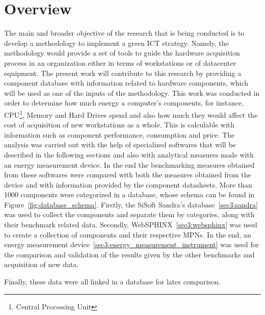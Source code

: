 \section{Overview} \label{sec3:overview}
    The main and broader objective of the research that is being conducted is to develop a methodology to implement a green ICT strategy. Namely, the methodology would provide a set of tools to guide the hardware acquisition process in an organization either in terms of workstations or of datacenter equipment.
    The present work will contribute to this research by providing a component database with information related to hardware components, which will be used as one of the inputs of the methodology.
    This work was conducted in order to determine how much energy a computer's components, for instance, CPU\footnote{Central Processing Unit}, Memory and Hard Drives spend and also how much they would affect the cost of acquisition of new workstations as a whole. This is calculable with information such as component performance, consumption and price. The analysis was carried out with the help of specialized softwares that will be described in the following sections and also with analytical measures made with an energy measurement device. In the end the benchmarking measures obtained from these softwares were compared with both the measures obtained from the device and with information provided by the component datasheets. More than 1000 components were categorized in a database, whose schema can be found in Figure~\ref{fig:database_schema}. Firstly, the SiSoft Sandra's database~\ref{sec3:sandra} was used to collect the components and separate them by categories, along with their benchmark related data. Secondly, WebSPHINX~\ref{sec3:websphinx} was used to create a collection of components and their respective MPNs. In the end, an energy measurement device~\ref{sec3:energy_measurement_instrument} was used for the comparison and validation of the results given by the other benchmarks and acquisition of new data. 

    Finally, these data were all linked in a database for later comparison. 

